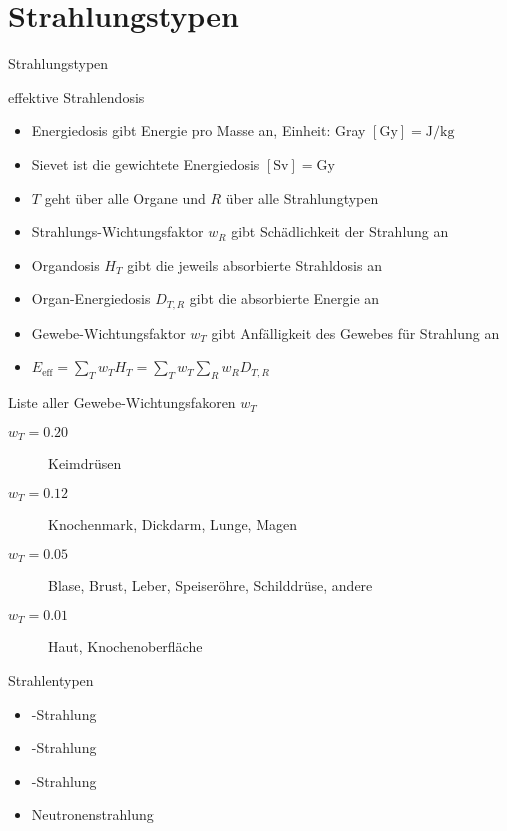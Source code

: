\section{Strahlungstypen}
\begin{frame}
	\begin{block}{Strahlungstypen}
	\end{block}
\end{frame}
\begin{frame}{effektive Strahlendosis}
\begin{itemize}
	\item Energiedosis gibt Energie pro Masse an, Einheit: Gray $[\si{\gray}]=\si{\joule \per \kilo \gram}$
	\item Sievet ist die gewichtete Energiedosis $[\si{\sievert}]=\si{\gray}$
	\item $T$ geht über alle Organe und $R$ über alle Strahlungtypen
	\item Strahlungs-Wichtungsfaktor $w_R$ gibt Schädlichkeit der Strahlung an
	\item Organdosis $H_T$ gibt die jeweils absorbierte Strahldosis an
	\item Organ-Energiedosis $D_{T,R}$ gibt die absorbierte Energie an
	\item Gewebe-Wichtungsfaktor $w_T$ gibt Anfälligkeit des Gewebes für Strahlung an
	\item $E_\mathrm{eff}=\sum_T w_TH_T =\sum_T w_T \sum_R w_RD_{T,R}$
\end{itemize}
\end{frame}
\begin{frame}{Liste aller Gewebe-Wichtungsfakoren $w_T$}
	\begin{description}
		\item[$w_T=0.20$] Keimdrüsen
		\item[$w_T=0.12$] Knochenmark, Dickdarm, Lunge, Magen
		\item[$w_T=0.05$] Blase, Brust, Leber, Speiseröhre, Schilddrüse, andere
		\item[$w_T=0.01$] Haut, Knochenoberfläche
	\end{description}
\end{frame}
\begin{frame}{Strahlentypen}
	\begin{itemize}
		\item \alpha-Strahlung
		\item \beta-Strahlung
		\item \gamma-Strahlung
		\item Neutronenstrahlung
	\end{itemize}
\end{frame}
